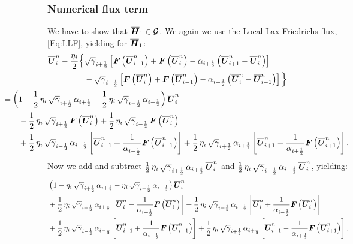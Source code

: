 \documentclass[10pt,preprint]{aastex}
\begin{document}
\subsubsection{Numerical flux term}
We have to show that $\overline{\boldsymbol{H}}_{1}\in\mathcal{G}$. We again we use the Local-Lax-Friedrichs flux, \eqref{Eq:LLF}, yielding for $\overline{\boldsymbol{H}}_{1}$:
\begin{align}
    \ol{\bU}^{n}_{i}-\f{\eta_{i}}{2}\Big\{&\sqrtgm_{\iph}\left[\bF\left(\ol{\bU}^{n}_{i+1}\right)+\bF\left(\ol{\bU}^{n}_{i}\right)-\alpha_{\iph}\left(\ol{\bU}^{n}_{i+1}-\ol{\bU}^{n}_{i}\right)\right]\\
    &-\sqrtgm_{\imh}\left[\bF\left(\ol{\bU}^{n}_{i}\right)+\bF\left(\ol{\bU}^{n}_{i-1}\right)-\alpha_{\imh}\left(\ol{\bU}^{n}_{i}-\ol{\bU}^{n}_{i-1}\right)\right]\Big\}\\
    &\hspace{-10em}=\left(1-\f{1}{2}\,\eta_{i}\,\sqrtgm_{\iph}\,\alpha_{\iph}-\f{1}{2}\,\eta_{i}\,\sqrtgm_{\imh}\,\alpha_{\imh}\right)\ol{\bU}^{n}_{i}\\
    &\hspace{-8em}-\f{1}{2}\,\eta_{i}\,\sqrtgm_{\iph}\,\bF\left(\ol{\bU}^{n}_{i}\right)+\f{1}{2}\,\eta_{i}\,\sqrtgm_{\imh}\,\bF\left(\ol{\bU}^{n}_{i}\right)\\
    &\hspace{-8em}+\f{1}{2}\,\eta_{i}\,\sqrtgm_{\imh}\,\alpha_{\imh}\left[\ol{\bU}^{n}_{i-1}+\f{1}{\alpha_{\imh}}\bF\left(\ol{\bU}^{n}_{i-1}\right)\right]+\f{1}{2}\,\eta_{i}\,\sqrtgm_{\iph}\,\alpha_{\iph}\left[\ol{\bU}^{n}_{i+1}-\f{1}{\alpha_{\iph}}\bF\left(\ol{\bU}^{n}_{i+1}\right)\right].
\end{align}
Now we add and subtract $\frac{1}{2}\,\eta_{i}\,\sqrt{\gamma}_{i+\frac{1}{2}}\,\alpha_{i+\frac{1}{2}}\,\overline{\boldsymbol{U}}^{n}_{i}$ and $\frac{1}{2}\,\eta_{i}\,\sqrt{\gamma}_{i-\frac{1}{2}}\,\alpha_{i-\frac{1}{2}}\,\overline{\boldsymbol{U}}^{n}_{i}$, yielding:
\begin{align}
    &\left(1-\eta_{i}\,\sqrt{\gamma}_{i+\frac{1}{2}}\,\alpha_{i+\frac{1}{2}}-\eta_{i}\,\sqrt{\gamma}_{i-\frac{1}{2}}\,\alpha_{i-\frac{1}{2}}\right)\overline{\boldsymbol{U}}^{n}_{i}\\
    &+\frac{1}{2}\,\eta_{i}\,\sqrt{\gamma}_{i+\frac{1}{2}}\,\alpha_{i+\frac{1}{2}}\left[\overline{\boldsymbol{U}}^{n}_{i}-\frac{1}{\alpha_{i+\frac{1}{2}}}\boldsymbol{F}\left(\overline{\boldsymbol{U}}^{n}_{i}\right)\right]+\frac{1}{2}\,\eta_{i}\,\sqrt{\gamma}_{i-\frac{1}{2}}\,\alpha_{i-\frac{1}{2}}\left[\overline{\boldsymbol{U}}^{n}_{i}+\frac{1}{\alpha_{i-\frac{1}{2}}}\boldsymbol{F}\left(\overline{\boldsymbol{U}}^{n}_{i}\right)\right]\\
    &+\frac{1}{2}\,\eta_{i}\,\sqrt{\gamma}_{i-\frac{1}{2}}\,\alpha_{i-\frac{1}{2}}\left[\overline{\boldsymbol{U}}^{n}_{i-1}+\frac{1}{\alpha_{i-\frac{1}{2}}}\boldsymbol{F}\left(\overline{\boldsymbol{U}}^{n}_{i-1}\right)\right]+\frac{1}{2}\,\eta_{i}\,\sqrt{\gamma}_{i+\frac{1}{2}}\,\alpha_{i+\frac{1}{2}}\left[\overline{\boldsymbol{U}}^{n}_{i+1}-\frac{1}{\alpha_{i+\frac{1}{2}}}\boldsymbol{F}\left(\overline{\boldsymbol{U}}^{n}_{i+1}\right)\right].
\end{align}
\end{document}
